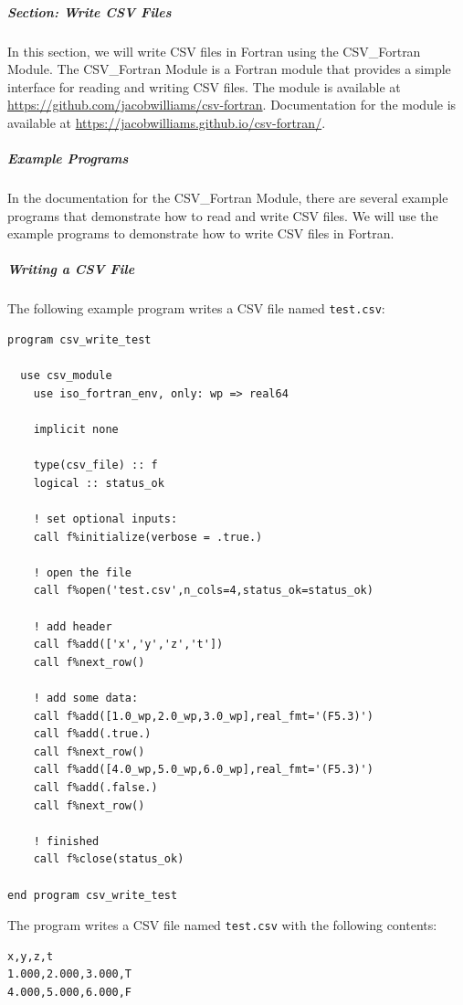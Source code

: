 \subparagraph{Section: Write CSV Files}

In this section, we will write CSV files in Fortran using the CSV\_Fortran Module.  The CSV\_Fortran Module is a Fortran module that provides a simple interface for reading and writing CSV files.  The module is available at \href{https://github.com/jacobwilliams/csv-fortran}{https://github.com/jacobwilliams/csv-fortran}.  Documentation for the module is available at \href{https://jacobwilliams.github.io/csv-fortran/}{https://jacobwilliams.github.io/csv-fortran/}.

\subparagraph{Example Programs}

In the documentation for the CSV\_Fortran Module, there are several example programs that demonstrate how to read and write CSV files.  We will use the example programs to demonstrate how to write CSV files in Fortran.

\subparagraph{Writing a CSV File}

The following example program writes a CSV file named \texttt{test.csv}:

\begin{verbatim}
program csv_write_test

  use csv_module
    use iso_fortran_env, only: wp => real64

    implicit none

    type(csv_file) :: f
    logical :: status_ok

    ! set optional inputs:
    call f%initialize(verbose = .true.)

    ! open the file
    call f%open('test.csv',n_cols=4,status_ok=status_ok)

    ! add header
    call f%add(['x','y','z','t'])
    call f%next_row()

    ! add some data:
    call f%add([1.0_wp,2.0_wp,3.0_wp],real_fmt='(F5.3)')
    call f%add(.true.)
    call f%next_row()
    call f%add([4.0_wp,5.0_wp,6.0_wp],real_fmt='(F5.3)')
    call f%add(.false.)
    call f%next_row()

    ! finished
    call f%close(status_ok)
  
end program csv_write_test
\end{verbatim}

The program writes a CSV file named \texttt{test.csv} with the following contents:

\begin{verbatim}
x,y,z,t
1.000,2.000,3.000,T
4.000,5.000,6.000,F
\end{verbatim}

